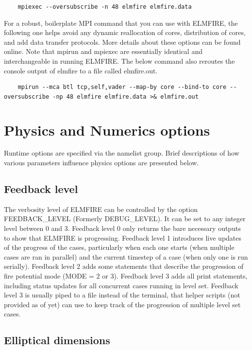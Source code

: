 \begin{verbatim}
    mpiexec --oversubscribe -n 48 elmfire elmfire.data
\end{verbatim}

For a robust, boilerplate MPI command that you can use with ELMFIRE, the following one helps avoid any dynamic reallocation of cores, distribution of cores, and add data transfer protocols. More details about these options can be found online. Note that mpirun and mpiexec are essentially identical and interchangeable in running ELMFIRE. The below command also reroutes the console output of elmfire to a file called elmfire.out. 

\begin{verbatim}
    mpirun --mca btl tcp,self,vader --map-by core --bind-to core --oversubscribe -np 48 elmfire elmfire.data >& elmfire.out
\end{verbatim}

\section{Physics and Numerics options}

Runtime options are specified via the  namelist group. Brief descriptions of how various parameters influence physics options are presented below.

\subsection{Feedback level}
\label{feedbacklevel}

The verbosity level of ELMFIRE can be controlled by the option FEEDBACK\_LEVEL (Formerly DEBUG\_LEVEL). It can be set to any integer level between 0 and 3. Feedback level 0 only returns the bare necessary outputs to show that ELMFIRE is progressing. Feedback level 1 introduces live updates of the progress of the cases, particularly when each one starts (when multiple cases are ran in parallel) and the current timestep of a case (when only one is run serially). Feedback level 2 adds some statements that describe the progression of fire potential mode (MODE = 2 or 3). Feedback level 3 adds all print statements, including status updates for all concurrent cases running in level set. Feedback level 3 is usually piped to a file instead of the terminal, that helper scripts (not provided as of yet) can use to keep track of the progression of multiple level set cases. 

\subsection{Elliptical dimensions}
\label{elliptical_dimensions}

